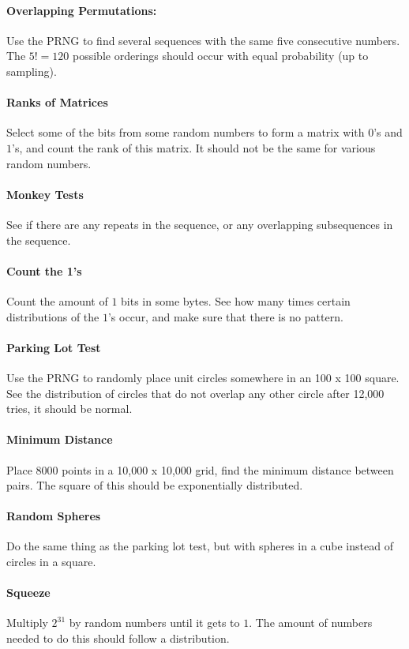 \documentclass[11pt]{article}
\begin{document}
\paragraph{Overlapping Permutations:}
Use the PRNG to find several sequences with the same five consecutive numbers. The $5! = 120$ possible orderings should occur with equal probability (up to sampling). 
\paragraph{Ranks of Matrices} 
Select some of the bits from some random numbers to form a matrix with $0$'s and $1$'s, and count the rank of this matrix. It should not be the same for various random numbers.
\paragraph{Monkey Tests}
See if there are any repeats in the sequence, or any overlapping subsequences in the sequence. 
\paragraph{Count the 1's}
Count the amount of $1$ bits in some bytes. See how many times certain distributions of the $1$'s occur, and make sure that there is no pattern.
\paragraph{Parking Lot Test}
Use the PRNG to randomly place unit circles somewhere in an 100 x 100 square. See the distribution of circles that do not overlap any other circle after 12,000 tries, it should be normal.
\paragraph{Minimum Distance}
Place $8000$ points in a 10,000 x 10,000 grid, find the minimum distance between pairs. The square of this should be exponentially distributed.
\paragraph{Random Spheres} Do the same thing as the parking lot test, but with spheres in a cube instead of circles in a square. 
\paragraph{Squeeze}
Multiply $2^{31}$ by random numbers until it gets to $1$. The amount of numbers needed to do this should follow a distribution.
\end{document}
